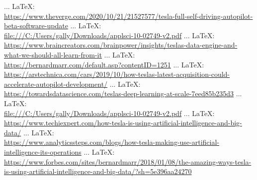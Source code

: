 \begin{thebibliography}{99}
{{{{ ... \LaTeX:\\ \url{https://www.theverge.com/2020/10/21/21527577/tesla-full-self-driving-autopilot-beta-software-update}
 ... \LaTeX:\\ \url{file:///C:/Users/gally/Downloads/applsci-10-02749-v2.pdf}
 ... \LaTeX:\\ \url{https://www.braincreators.com/brainpower/insights/teslas-data-engine-and-what-we-should-all-learn-from-it}
 ... \LaTeX:\\ \url{https://bernardmarr.com/default.asp?contentID=1251}
 ... \LaTeX:\\ \url{https://arstechnica.com/cars/2019/10/how-teslas-latest-acquisition-could-accelerate-autopilot-development/}
 ... \LaTeX:\\ \url{https://towardsdatascience.com/teslas-deep-learning-at-scale-7eed85b235d3}
 ... \LaTeX:\\ \url{file:///C:/Users/gally/Downloads/applsci-10-02749-v2.pdf}
 ... \LaTeX:\\ \url{https://www.techiexpert.com/how-tesla-is-using-artificial-intelligence-and-big-data/}
 ... \LaTeX:\\ \url{https://www.analyticssteps.com/blogs/how-tesla-making-use-artificial-intelligence-its-operations}
 ... \LaTeX:\\ \url{https://www.forbes.com/sites/bernardmarr/2018/01/08/the-amazing-ways-tesla-is-using-artificial-intelligence-and-big-data/?sh=5e396aa24270}
}}}}
\end{thebibliography}
